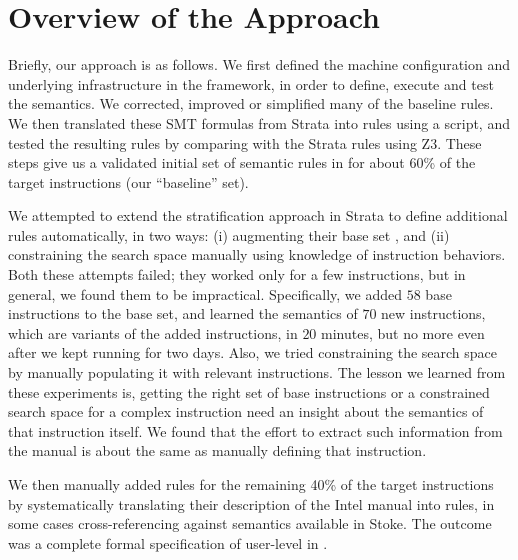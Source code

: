\section{Overview of the Approach}
\label{sec:Approach:Overview}

Briefly, our approach is as follows.
%
We first defined the machine configuration and underlying infrastructure in the \K framework, in order to define, execute and test the \ISA semantics.
%
%
We corrected, improved or simplified many of the baseline rules.
%
We then translated these SMT formulas from Strata into \K rules using a script, and tested the resulting rules by comparing with the Strata rules using Z3.
%
These steps give us a validated initial set of semantic rules in \K for about 60\% of the target instructions (our ``baseline'' set).

We attempted to extend the stratification approach in Strata to define additional rules automatically, in two ways: (i) augmenting their base set , and (ii) constraining the search space manually using knowledge of instruction behaviors.  Both these attempts failed; they worked only for a few instructions, but in general, we found them to be impractical. Specifically, we added $58$ base instructions to the base set, and learned the semantics of $70$ new instructions, which are variants of the added  instructions, in $20$ minutes, but no more even after we kept running for two days. Also, we tried constraining the search space by manually populating it with relevant instructions. The lesson we learned from these experiments is, getting the right set of base instructions or a constrained search space for a complex instruction need an insight about the semantics of that instruction itself. We found that the effort to extract such information from the manual is about the same  as manually defining that instruction.



We then manually added \K rules for the remaining 40\% of the target instructions by systematically translating their description of the Intel manual into \K rules, in some cases cross-referencing against semantics available in Stoke.
%
The outcome was a complete formal specification of user-level \ISA in \K.

